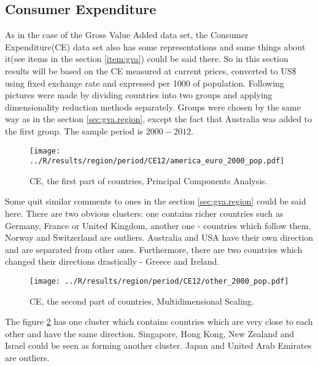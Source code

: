 \documentclass[a4paper]{article}
\begin{document}
\subsection{Consumer Expenditure}
As in the case of the Gross Value Added data set, the Consumer Expenditure(CE) data set also has some representations and same things about it(see items in the section \ref{item:gva}) could be said there. So in this section results will be based on the CE measured at current prices, converted to US\$ using fixed exchange rate and expressed per 1000 of population. Following pictures were made by dividing countries into two groups and applying dimensionality reduction methods separately. Groups were chosen by the same way as in the section \ref{sec:gva.region}, except the fact that Australia was added to the first group. The sample period is $2000-2012$.     

\begin{figure}[!htbp]
\begin{center}
\texttt{[image: ../R/results/region/period/CE12/america\_euro\_2000\_pop.pdf]}
\caption{CE, the first part of countries, Principal Components Analysis.}
\label{fig:ce.region.first.pca}
\end{center}
\end{figure}

Some quit similar comments to ones in the section \ref{sec:gva.region} could be said here. There are two obvious clusters: one contains richer countries such as Germany, France or United Kingdom, another one - countries which follow them. Norway and Switzerland are outliers. Australia and USA have their own direction and are separated from other ones. Furthermore, there are two countries which changed their directions drastically - Greece and Ireland.   

\begin{figure}[!htbp]
\begin{center}
\texttt{[image: ../R/results/region/period/CE12/other\_2000\_pop.pdf]}
\caption{CE, the second part of countries, Multidimensional Scaling.}
\label{fig:ce.region.second.mds}
\end{center}
\end{figure}

The figure \ref{fig:ce.region.second.mds} has one cluster which contains countries which are very close to each other and have the same direction. Singapore, Hong Kong, New Zealand and Israel could be seen as forming another cluster. Japan and United Arab Emirates are outliers.   
\end{document}
